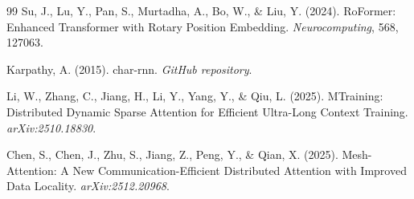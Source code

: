 \documentclass[11pt,a4paper]{article}
\begin{document}
\begin{thebibliography}{99}
Su, J., Lu, Y., Pan, S., Murtadha, A., Bo, W., \& Liu, Y. (2024).
\newblock RoFormer: Enhanced Transformer with Rotary Position Embedding.
\newblock \emph{Neurocomputing}, 568, 127063.

Karpathy, A. (2015).
\newblock char-rnn.
\newblock \emph{GitHub repository}.

Li, W., Zhang, C., Jiang, H., Li, Y., Yang, Y., \& Qiu, L. (2025).
\newblock MTraining: Distributed Dynamic Sparse Attention for Efficient Ultra-Long Context Training.
\newblock \emph{arXiv:2510.18830}.

Chen, S., Chen, J., Zhu, S., Jiang, Z., Peng, Y., \& Qian, X. (2025).
\newblock Mesh-Attention: A New Communication-Efficient Distributed Attention with Improved Data Locality.
\newblock \emph{arXiv:2512.20968}.

\end{thebibliography}
\end{document}

